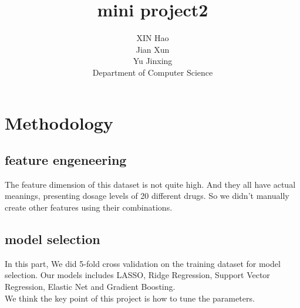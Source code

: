 \documentclass{article}
\title{mini project2}
\author{
  XIN Hao \\
  Jian Xun \\
  Yu Jinxing \\
  Department of Computer Science\\
}
\begin{document}

\maketitle



\section{Methodology}



\subsection{feature engeneering}
The feature dimension of this dataset is not quite high. And they all have actual meanings, presenting dosage levels of 20 different drugs. So we didn't manually create other features using their combinations.

\subsection{model selection}
In this part, We did 5-fold cross validation on the training dataset for model selection. Our models includes LASSO, Ridge Regression, Support Vector Regression, Elastic Net and Gradient Boosting. \\
We think the key point of this project is how to tune the parameters.
\end{document}
